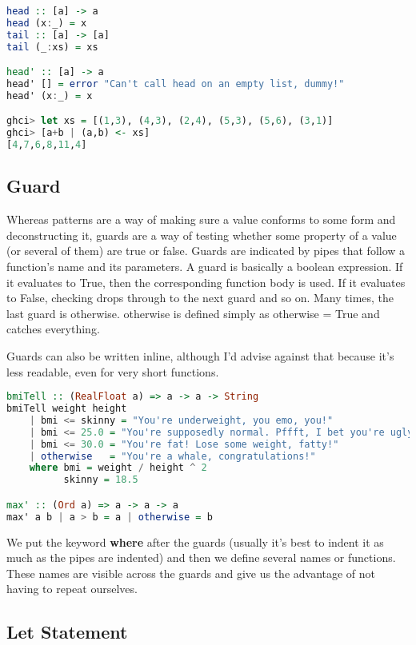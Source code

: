 \begin{lstlisting}[language=Haskell]
head :: [a] -> a
head (x:_) = x
tail :: [a] -> [a]
tail (_:xs) = xs

head' :: [a] -> a  
head' [] = error "Can't call head on an empty list, dummy!"  
head' (x:_) = x  

ghci> let xs = [(1,3), (4,3), (2,4), (5,3), (5,6), (3,1)]  
ghci> [a+b | (a,b) <- xs]  
[4,7,6,8,11,4]  
\end{lstlisting}

\subsection{Guard}

Whereas patterns are a way of making sure a value conforms to some form and deconstructing it, guards are a way of testing whether some property of a value (or several of them) are true or false. Guards are indicated by pipes that follow a function's name and its parameters. A guard is basically a boolean expression. If it evaluates to True, then the corresponding function body is used. If it evaluates to False, checking drops through to the next guard and so on. Many times, the last guard is otherwise. otherwise is defined simply as otherwise = True and catches everything. 

Guards can also be written inline, although I'd advise against that because it's less readable, even for very short functions.

\begin{lstlisting}[language=Haskell]
bmiTell :: (RealFloat a) => a -> a -> String  
bmiTell weight height  
    | bmi <= skinny = "You're underweight, you emo, you!"  
    | bmi <= 25.0 = "You're supposedly normal. Pffft, I bet you're ugly!"  
    | bmi <= 30.0 = "You're fat! Lose some weight, fatty!"  
    | otherwise   = "You're a whale, congratulations!"  
    where bmi = weight / height ^ 2 
          skinny = 18.5  

max' :: (Ord a) => a -> a -> a  
max' a b | a > b = a | otherwise = b  
\end{lstlisting}

We put the keyword \textbf{where} after the guards (usually it's best to indent it as much as the pipes are indented) and then we define several names or functions. These names are visible across the guards and give us the advantage of not having to repeat ourselves.

\clearpage
\subsection{Let Statement}

